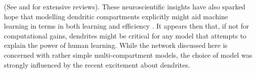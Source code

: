(See \citep{Larkum2022} and \citep{Poirazi2020} for extensive reviews). These neuroscientific insights have also sparked
hope that modelling dendritic compartments explicitly might aid machine learning in terms in both learning and
efficiency \citep{Chavlis2021,guerguiev2017towards,Richards2019,Eyal2018}. It appears then that, if not for
computational gains, dendrites might be critical for any model that attempts to explain the power of human learning.
While the network discussed here is concerned with rather simple multi-compartment models, the choice of model was
strongly influenced by the recent excitement about dendrites.





